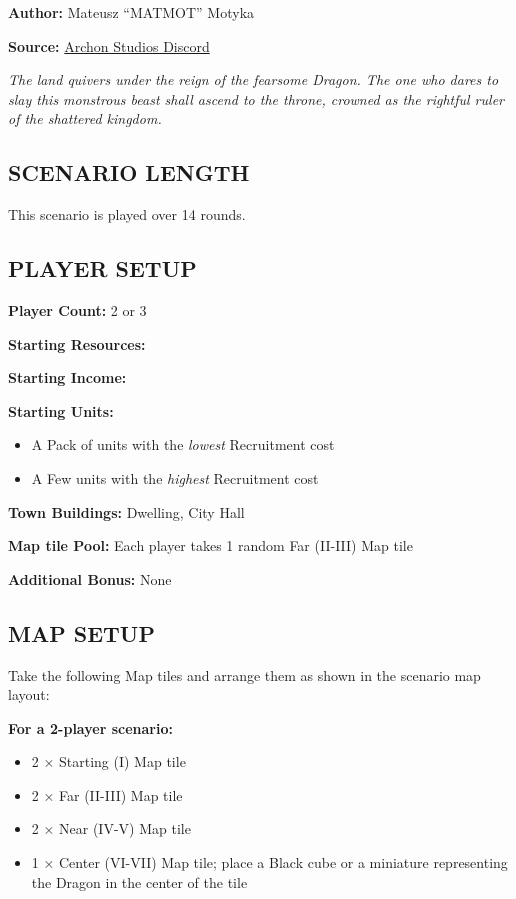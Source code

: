 
\begin{multicols*}{2}

\textbf{Author:} Mateusz ``MATMOT'' Motyka

\textbf{Source:} \href{https://discord.com/channels/740870068178649108/1229888426975821926}{Archon Studios Discord}

\textit{The land quivers under the reign of the fearsome Dragon.
  The one who dares to slay this monstrous beast shall ascend to the throne, crowned as the rightful ruler of the shattered kingdom.
}

\subsection*{\MakeUppercase{Scenario Length}}
This scenario is played over 14 rounds.

\subsection*{\MakeUppercase{Player Setup}}
\textbf{Player Count:} 2 or 3

\textbf{Starting Resources:}\par
{}

\textbf{Starting Income:}\par
{}

\textbf{Starting Units:}
\begin{itemize}
  \item A Pack of  units with the \textit{lowest} Recruitment cost
  \item A Few  units with the \textit{highest} Recruitment cost
\end{itemize}

\textbf{Town Buildings:}  Dwelling, City Hall

\textbf{Map tile Pool:} Each player takes 1 random Far (II-III) Map tile

\textbf{Additional Bonus:} None

\subsection*{\MakeUppercase{Map Setup}}
Take the following Map tiles and arrange them as shown in the scenario map layout:

\textbf{For a 2-player scenario:}
\begin{itemize}
  \item 2 × Starting (I) Map tile
  \item 2 × Far (II-III) Map tile
  \item 2 × Near (IV-V) Map tile
  \item 1 × Center (VI-VII) Map tile; place a Black cube or a miniature representing the Dragon in the center of the tile
\end{itemize}


\end{multicols*}

